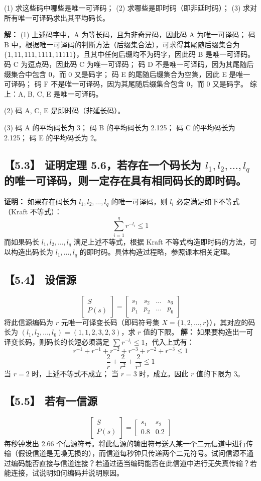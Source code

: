\documentclass[11pt, a4paper]{article}
\begin{document}
(1) 求这些码中哪些是唯一可译码；
(2) 求哪些是即时码（即非延时码）；
(3) 求对所有唯一可译码求出其平均码长。

\textbf{解：}
(1) 上述码字中，A 为等长码，且为非奇异码，因此码 A 为唯一可译码；
码 B 中，根据唯一可译码的判断方法（后缀集合法），可求得其尾随后缀集合为 $\{1, 11, 111, 1111, 11111\}$，且其中任何后缀均不为码字，因此码 B 是唯一可译码。
码 C 为逗点码，因此码 C 为唯一可译码；
码 D 不是唯一可译码，因为其尾随后缀集合中包含 0，而 0 又是码字；
码 E 的尾随后缀集合为空集，因此 E 是唯一可译码；
码 F 不是唯一可译码，因为其尾随后缀集合包含 0，而 0 又是码字。
综上：A, B, C, E 是唯一可译码。

(2) 码 A, C, E 是即时码（非延长码）。

(3) 码 A 的平均码长为 3；
码 B 的平均码长为 2.125；
码 C 的平均码长为 2.125；
码 E 的平均码长为 2。

\subsection*{【5.3】 证明定理 5.6，若存在一个码长为 $l_1, l_2, \dots, l_q$ 的唯一可译码，则一定存在具有相同码长的即时码。}
\textbf{证明：}
如果存在码长为 $l_1, l_2, \dots, l_q$ 的唯一可译码，则 $l_i$ 必定满足如下不等式（Kraft 不等式）：
\[ \sum_{i=1}^q r^{-l_i} \le 1 \]
而如果码长 $l_1, l_2, \dots, l_q$ 满足上述不等式，根据 Kraft 不等式构造即时码的方法，可以构造出码长为 $l_1, \dots, l_q$ 的即时码。具体构造过程略，参照课本相关定理。

\subsection*{【5.4】 设信源}
\[ \begin{bmatrix} S \\ P(s) \end{bmatrix} = \begin{bmatrix} s_1 & s_2 & \dots & s_6 \\ p_1 & p_2 & \dots & p_6 \end{bmatrix} \]
将此信源编码为 $r$ 元唯一可译变长码（即码符号集 $X=\{1, 2, \dots, r\}$），其对应的码长为 $(l_1, l_2, \dots, l_6) = (1, 1, 2, 3, 2, 3)$，求 $r$ 值的下限。
\textbf{解：}
如果要构造出一可译变长码，则码长的长短必须满足 $\sum r^{-l_i} \le 1$，代入上式有：
\[ r^{-1} + r^{-1} + r^{-2} + r^{-3} + r^{-2} + r^{-3} \le 1 \]
\[ \frac{2}{r} + \frac{2}{r^2} + \frac{2}{r^3} \le 1 \]
当 $r=2$ 时，上述不等式不成立；
当 $r=3$ 时，成立。因此 $r$ 值的下限为 3。

\subsection*{【5.5】 若有一信源}
\[ \begin{bmatrix} S \\ P(s) \end{bmatrix} = \begin{bmatrix} s_1 & s_2 \\ 0.8 & 0.2 \end{bmatrix} \]
每秒钟发出 2.66 个信源符号。将此信源的输出符号送入某一个二元信道中进行传输（假设信道是无噪无损的），而信道每秒钟只传递两个二元符号。试问信源不通过编码能否直接与信道连接？若通过适当编码能否在此信道中进行无失真传输？若能连接，试说明如何编码并说明原因。
\end{document}

